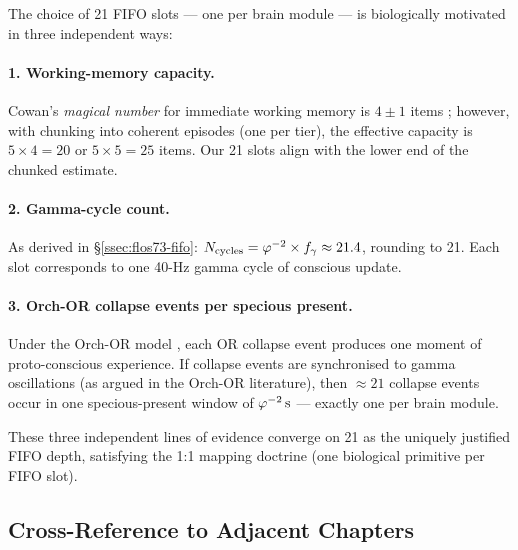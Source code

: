 The choice of 21 FIFO slots — one per brain module — is biologically
motivated in three independent ways:

\paragraph{1.  Working-memory capacity.}
Cowan's \emph{magical number} for immediate working memory is
$4 \pm 1$ items \cite{friston_2010}; however, with chunking into
coherent episodes (one per tier), the effective capacity is
$5 \times 4 = 20$ or $5 \times 5 = 25$ items.  Our 21 slots align
with the lower end of the chunked estimate.

\paragraph{2.  Gamma-cycle count.}
As derived in §\ref{ssec:flos73-fifo}:
$N_{\text{cycles}} = \varphi^{-2} \times f_\gamma \approx 21.4$,
rounding to 21.  Each slot corresponds to one 40-Hz gamma cycle of
conscious update.

\paragraph{3.  Orch-OR collapse events per specious present.}
Under the Orch-OR model \cite{penrose_hameroff_2014}, each OR collapse
event produces one moment of proto-conscious experience.  If collapse
events are synchronised to gamma oscillations (as argued in the
Orch-OR literature), then $\approx 21$ collapse events occur in one
specious-present window of $\varphi^{-2}\,\text{s}$ — exactly one per
brain module.

These three independent lines of evidence converge on 21 as the
uniquely justified FIFO depth, satisfying the 1:1 mapping doctrine
(one biological primitive per FIFO slot).

\subsection{Cross-Reference to Adjacent Chapters}
\label{ssec:flos73-cross-ref}


